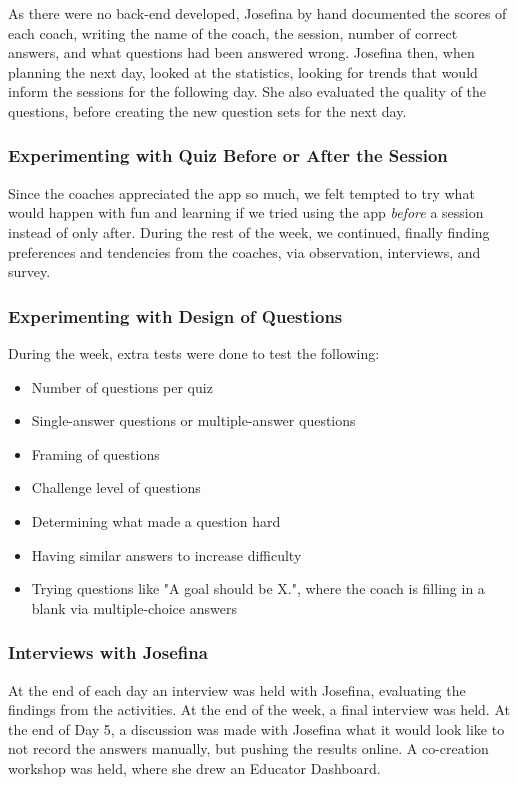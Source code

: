 As there were no back-end developed, Josefina by hand documented the scores of each coach, writing the name of the coach, the session, number of correct answers, and what questions had been answered wrong. Josefina then, when planning the next day, looked at the statistics, looking for trends that would inform the sessions for the following day. She also evaluated the quality of the questions, before creating the new question sets for the next day.

\subsubsection{Experimenting with Quiz Before or After the Session}
Since the coaches appreciated the app so much, we felt tempted to try what would happen with fun and learning if we tried using the app \textit{before} a session instead of only after. During the rest of the week, we continued, finally finding preferences and tendencies from the coaches, via observation, interviews, and survey.

\subsubsection{Experimenting with Design of Questions}
During the week, extra tests were done to test the following:

\begin{itemize}
\item Number of questions per quiz
\item Single-answer questions or multiple-answer questions
\item Framing of questions
\item Challenge level of questions
\item Determining what made a question hard
\item Having similar answers to increase difficulty
\item Trying questions like "A goal should be X.", where the coach is filling in a blank via multiple-choice answers
\end{itemize}

\subsubsection{Interviews with Josefina}
At the end of each day an interview was held with Josefina, evaluating the findings from the activities. At the end of the week, a final interview was held. At the end of Day 5, a discussion was made with Josefina what it would look like to not record the answers manually, but pushing the results online. A co-creation workshop was held, where she drew an Educator Dashboard.

